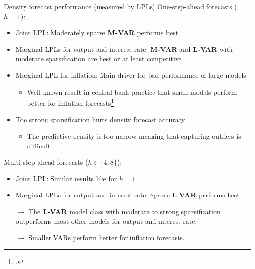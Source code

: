     \begin{frame}{Density forecast performance (measured by LPLs)}
        One-step-ahead forecasts ($h = 1$):
        \begin{itemize}
            \item Joint LPL: Moderately sparse \textbf{M-VAR} performs best
            \item Marginal LPLs for output and interest rate: \textbf{M-VAR} and \textbf{L-VAR} with moderate sparsification are best or at least competitive
            \item Marginal LPL for inflation: Main driver for bad performance of large models
                \begin{itemize}
                    \item Well known result in central bank practice that small models perform better for inflation forecasts\footcite{giannone_prior_2015}
                \end{itemize}
            \item Too strong sparsification hurts density forecast accuracy
                \begin{itemize}
                    \item The predictive density is too narrow meaning that capturing outliers is difficult
                \end{itemize}
        \end{itemize}
        
        Multi-step-ahead forecasts ($h \in \{ 4 , 8 \}$):
        \begin{itemize}
            \item Joint LPL: Similar results like for $h = 1$
            \item Marginal LPLs for output and interest rate: Sparse \textbf{L-VAR} performs best
        \end{itemize}
        
        \begin{itemize}
            \item[$\rightarrow$] The \textbf{L-VAR} model class with moderate to strong sparsification outperforms most other models for output and interest rate.
            \item[$\rightarrow$] Smaller VARs perform better for inflation forecasts.
        \end{itemize}
    \end{frame}
\fi

